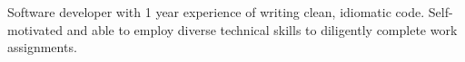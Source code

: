 \documentclass[11pt,a4paper,sans]{moderncv}        %
\begin{document}
\makecvtitle


Software developer with 1 year experience of writing clean, idiomatic code. Self-motivated and able to employ diverse technical skills to diligently complete work assignments.
\end{document}
